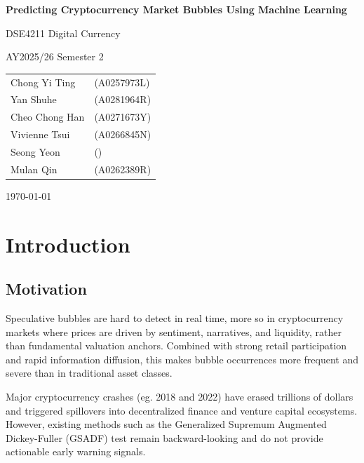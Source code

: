 \documentclass[12pt,a4paper]{article}
\begin{document}
\begin{titlepage}
  \centering
  \vspace*{2cm}
  {\LARGE\bfseries 
  Predicting Cryptocurrency Market Bubbles Using Machine Learning\par}
  
  \vspace{1.5cm}
  {\large DSE4211 Digital Currency\par}
  {\large AY2025/26 Semester 2\par}
  \vspace{1.5cm}
  {\large
    \begin{tabular}{ll}
      Chong Yi Ting              & (A0257973L) \\
      Yan Shuhe            & (A0281964R) \\
      Cheo Chong Han       & (A0271673Y) \\
      Vivienne Tsui        & (A0266845N) \\
      Seong Yeon           & () \\
      Mulan Qin            & (A0262389R) \\
    \end{tabular}
  \par}
  \vspace{2cm}
  {\large \today\par}
\end{titlepage}

\tableofcontents
\newpage

\setcounter{page}{1}

\section{Introduction}
\subsection{Motivation}

Speculative bubbles are hard to detect in real time, more so in cryptocurrency markets where prices are driven by sentiment, narratives, and liquidity, rather than fundamental valuation anchors. Combined with strong retail participation and rapid information diffusion, this makes bubble occurrences more frequent and severe than in traditional asset classes. 

Major cryptocurrency crashes (eg. 2018 and 2022) have erased trillions of dollars and triggered spillovers into decentralized finance and venture capital ecosystems. However, existing methods such as the Generalized Supremum Augmented Dickey-Fuller (GSADF) test remain backward-looking and do not provide actionable early warning signals. 
\end{document}
